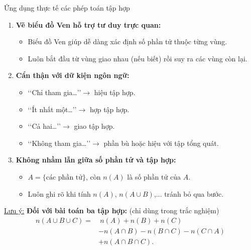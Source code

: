 \begin{dang}{Ứng dụng thực tế các phép toán tập hợp}
\begin{enumerate}
	\item \textbf{Vẽ biểu đồ Ven hỗ trợ tư duy trực quan:}
	\begin{itemize}
		\item Biểu đồ Ven giúp dễ dàng xác định số phần tử thuộc từng vùng.
		\item Luôn bắt đầu từ vùng giao nhau (nếu biết) rồi suy ra các vùng còn lại.
	\end{itemize}
	\item \textbf{Cẩn thận với dữ kiện ngôn ngữ:}
	\begin{itemize}
		\item \lq\lq Chỉ tham gia…\rq\rq $\rightarrow$ hiệu tập hợp.
		\item \lq\lq Ít nhất một…\rq\rq $\rightarrow$ hợp tập hợp.
		\item \lq\lq Cả hai…\rq\rq $\rightarrow$ giao tập hợp.
		\item \lq\lq Không tham gia…\rq\rq $\rightarrow$ phần bù hoặc hiệu với tập tổng quát.
	\end{itemize}
	\item \textbf{Không nhầm lẫn giữa số phần tử và tập hợp:}
	\begin{itemize}
		\item $A = \{ \text{các phần tử} \}$, còn $n(A)$ là số phần tử của $A$.
		\item Luôn ghi rõ khi tính $n(A)$, $n(A \cup B)$,$\ldots$ tránh bỏ qua bước.
	\end{itemize}
\end{enumerate}
\underline{Lưu ý:} \textbf{Đối với bài toán ba tập hợp:} (chỉ dùng trong trắc nghiệm)
	\[
	\begin{aligned}
		n(A \cup B \cup C) =&~ n(A) + n(B) + n(C)\\
		&- n(A \cap B) - n(B \cap C) - n(C \cap A)\\
		&+ n(A \cap B \cap C).
	\end{aligned}
	\]
\end{dang}
